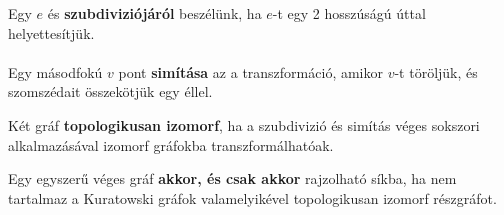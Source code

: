 \begin{frame}
\begin{tcolorbox}[title={Def.: Szubdivízió, Simítás}]
Egy $e$ és \textbf{szubdiviziójáról} beszélünk, ha $e$-t egy 2 hosszúságú úttal helyettesítjük.\\
\\
Egy másodfokú $v$ pont \textbf{simítása} az a transzformáció, amikor $v$-t töröljük, és szomszédait összekötjük egy éllel.
\end{tcolorbox}

\begin{tcolorbox}[title={Def.: Topologikus izomorfia}]
Két gráf \textbf{topologikusan izomorf}, ha a szubdivizió és simítás véges sokszori alkalmazásával izomorf gráfokba transzformálhatóak.
\end{tcolorbox}

\begin{tcolorbox}[title={Tétel: Kuratowski tétel}]
Egy egyszerű véges gráf \textbf{akkor, és csak akkor} rajzolható síkba, ha nem tartalmaz a Kuratowski gráfok valamelyikével topologikusan izomorf részgráfot.
\end{tcolorbox}
\end{frame}


